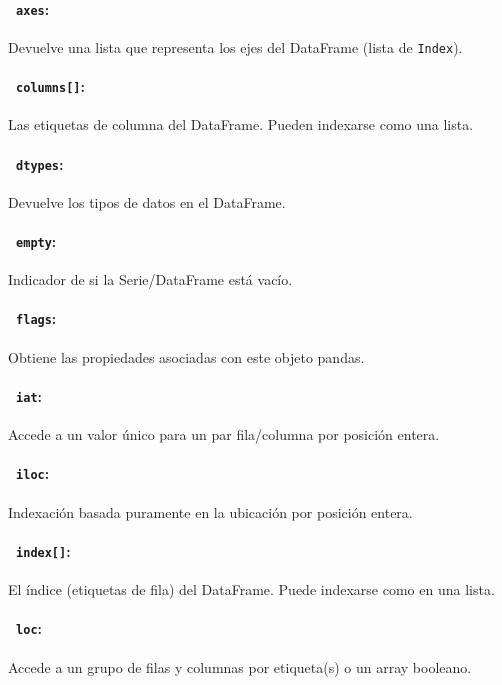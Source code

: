 \paragraph{~\hspace{2em}\texttt{axes}:} Devuelve una lista que representa los ejes del DataFrame (lista de \texttt{Index}).
\paragraph{~\hspace{2em}\texttt{columns[]}:} Las etiquetas de columna del DataFrame. Pueden indexarse como una lista.
\paragraph{~\hspace{2em}\texttt{dtypes}:} Devuelve los tipos de datos en el DataFrame.
\paragraph{~\hspace{2em}\texttt{empty}:} Indicador de si la Serie/DataFrame está vacío.
\paragraph{~\hspace{2em}\texttt{flags}:} Obtiene las propiedades asociadas con este objeto pandas.
\paragraph{~\hspace{2em}\texttt{iat}:} Accede a un valor único para un par fila/columna por posición entera.
\paragraph{~\hspace{2em}\texttt{iloc}:} Indexación basada puramente en la ubicación por posición entera.
\paragraph{~\hspace{2em}\texttt{index[]}:} El índice (etiquetas de fila) del DataFrame. Puede indexarse como en una lista.
\paragraph{~\hspace{2em}\texttt{loc}:} Accede a un grupo de filas y columnas por etiqueta(s) o un array booleano.
